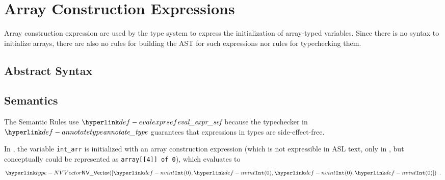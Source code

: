 \begin{mathpar}
\end{mathpar}

\section{Array Construction Expressions\label{sec:ArrayConstructionExpressions}}
Array construction expression are used by the type system to express the initialization
of array-typed variables. Since there is no syntax to initialize arrays, there are also
no rules for building the AST for such expressions nor rules for typechecking them.

\subsection{Abstract Syntax}
\BackupOriginalAST{
\begin{flalign*}
\expr \derives\ & \EArray\{\EArrayLength: \expr, \EArrayValue: \expr\} &\\
             |\ & \EEnumArray \{\EArrayLabels: \Identifier^+, \EArrayValue: \expr\}
\end{flalign*}
}

\subsection{Semantics}

The Semantic Rules use $\evalexprsef\empty$ because the typechecker in
$\annotatetype$ guarantees that expressions in types are side-effect-free.

In ,
the variable \verb|int_arr| is initialized with an array construction expression
(which is not expressible in ASL text, only in \typedast, but conceptually could be
represented as \verb|array[[4]] of 0|),
which evaluates to
\[
\NVVector([\nvint(0), \nvint(0), \nvint(0), \nvint(0)]) \enspace.
\]

